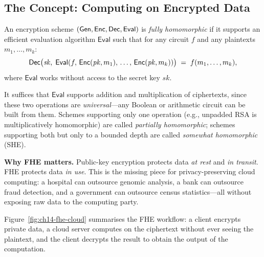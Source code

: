 \subsection{The Concept: Computing on Encrypted Data}
\label{subsec:fhe-concept}

\begin{definition}
\label{def:fhe}
An encryption scheme $(\mathsf{Gen}, \mathsf{Enc}, \mathsf{Dec}, \mathsf{Eval})$ is \emph{fully homomorphic} if it supports an efficient evaluation algorithm $\mathsf{Eval}$ such that for any circuit $f$ and any plaintexts $m_1, \ldots, m_k$:
\begin{equation}
\label{eq:fhe-correctness}
\mathsf{Dec}\bigl(\mathit{sk},\; \mathsf{Eval}(f,\, \mathsf{Enc}(\mathit{pk}, m_1),\, \ldots,\, \mathsf{Enc}(\mathit{pk}, m_k))\bigr) \;=\; f(m_1, \ldots, m_k),
\end{equation}
where $\mathsf{Eval}$ works without access to the secret key $\mathit{sk}$.
\end{definition}

It suffices that $\mathsf{Eval}$ supports addition and multiplication of ciphertexts, since these two operations are \emph{universal}---any Boolean or arithmetic circuit can be built from them.  Schemes supporting only one operation (e.g., unpadded RSA is multiplicatively homomorphic) are called \emph{partially homomorphic}; schemes supporting both but only to a bounded depth are called \emph{somewhat homomorphic} (SHE).

\begin{svgraybox}
\textbf{Why FHE matters.}
Public-key encryption protects data \emph{at rest} and \emph{in transit}.  FHE protects data \emph{in use}.  This is the missing piece for privacy-preserving cloud computing: a hospital can outsource genomic analysis, a bank can outsource fraud detection, and a government can outsource census statistics---all without exposing raw data to the computing party.
\end{svgraybox}

Figure~\ref{fig:ch14-fhe-cloud} summarises the FHE workflow: a client encrypts private data, a cloud server computes on the ciphertext without ever seeing the plaintext, and the client decrypts the result to obtain the output of the computation.

